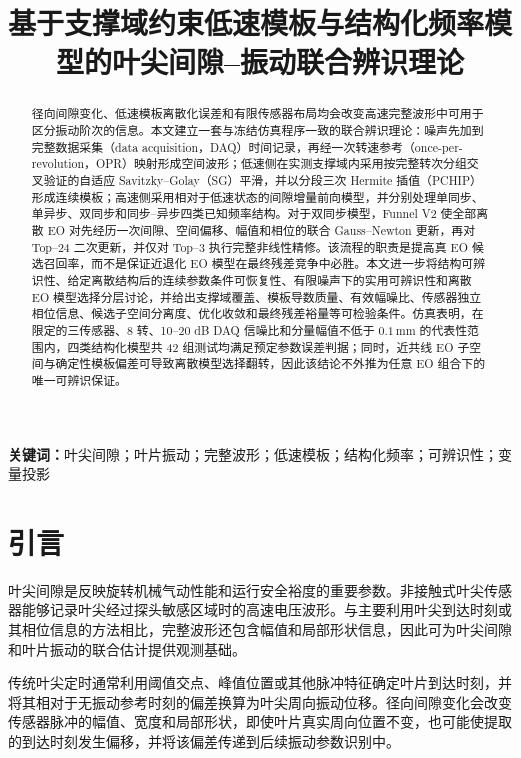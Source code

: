 \documentclass[UTF8,12pt,a4paper]{ctexart}
\title{基于支撑域约束低速模板与结构化频率模型的叶尖间隙--振动联合辨识理论}
\author{}
\date{}
\begin{document}
\maketitle

\begin{abstract}
径向间隙变化、低速模板离散化误差和有限传感器布局均会改变高速完整波形中可用于区分振动阶次的信息。本文建立一套与冻结仿真程序一致的联合辨识理论：噪声先加到完整数据采集（data acquisition，DAQ）时间记录，再经一次转速参考（once-per-revolution，OPR）映射形成空间波形；低速侧在实测支撑域内采用按完整转次分组交叉验证的自适应 Savitzky--Golay（SG）平滑，并以分段三次 Hermite 插值（PCHIP）形成连续模板；高速侧采用相对于低速状态的间隙增量前向模型，并分别处理单同步、单异步、双同步和同步--异步四类已知频率结构。对于双同步模型，Funnel V2 使全部离散 EO 对先经历一次间隙、空间偏移、幅值和相位的联合 Gauss--Newton 更新，再对 Top--24 二次更新，并仅对 Top--3 执行完整非线性精修。该流程的职责是提高真 EO 候选召回率，而不是保证近退化 EO 模型在最终残差竞争中必胜。本文进一步将结构可辨识性、给定离散结构后的连续参数条件可恢复性、有限噪声下的实用可辨识性和离散 EO 模型选择分层讨论，并给出支撑域覆盖、模板导数质量、有效幅噪比、传感器独立相位信息、候选子空间分离度、优化收敛和最终残差裕量等可检验条件。仿真表明，在限定的三传感器、8 转、10--20 dB DAQ 信噪比和分量幅值不低于 $0.1\,\mathrm{mm}$ 的代表性范围内，四类结构化模型共 42 组测试均满足预定参数误差判据；同时，近共线 EO 子空间与确定性模板偏差可导致离散模型选择翻转，因此该结论不外推为任意 EO 组合下的唯一可辨识保证。
\end{abstract}

\noindent\textbf{关键词：}叶尖间隙；叶片振动；完整波形；低速模板；结构化频率；可辨识性；变量投影

\section{引言}

叶尖间隙是反映旋转机械气动性能和运行安全裕度的重要参数。非接触式叶尖传感器能够记录叶尖经过探头敏感区域时的高速电压波形\cite{Yu2020,Muller1997}。与主要利用叶尖到达时刻或其相位信息的方法\cite{Diamond2021}相比，完整波形还包含幅值和局部形状信息，因此可为叶尖间隙和叶片振动的联合估计提供观测基础\cite{Heller2020}。

传统叶尖定时通常利用阈值交点、峰值位置或其他脉冲特征确定叶片到达时刻，并将其相对于无振动参考时刻的偏差换算为叶尖周向振动位移。径向间隙变化会改变传感器脉冲的幅值、宽度和局部形状，即使叶片真实周向位置不变，也可能使提取的到达时刻发生偏移，并将该偏差传递到后续振动参数识别中。
\end{document}
